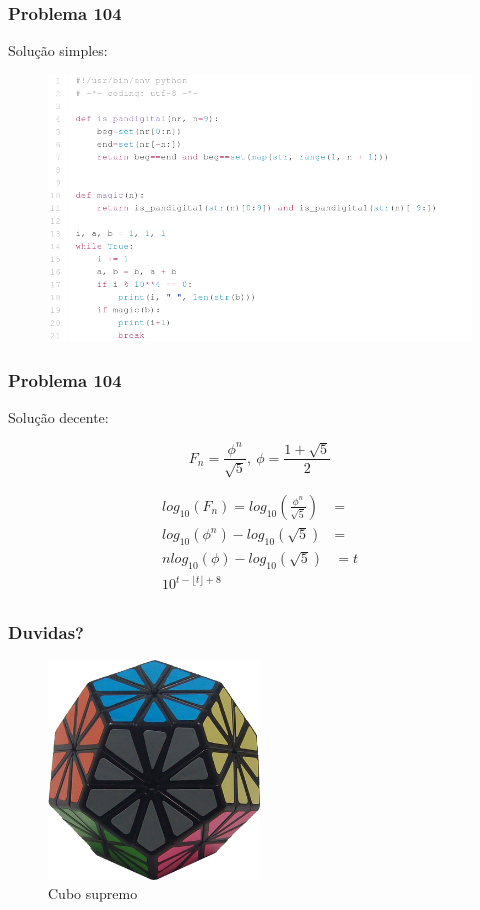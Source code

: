 \documentclass{beamer}
\begin{document}
\begin{frame}
    \frametitle{Problema 104}

    Solução simples:

    \begin{figure}[htpb]
        \centering
        \includegraphics[width=0.8\linewidth]{images/prob104.png}
    \end{figure}
\end{frame}

\begin{frame}
    \frametitle{Problema 104}

    Solução decente:

    \begin{equation}
        F_n = \frac{\phi^n}{\sqrt{5}},\: \phi = \frac{1+\sqrt{5}}{2}
    \end{equation}

    \begin{align}
        log_{10}(F_n) = log_{10}(\frac{\phi^n}{\sqrt{5}}) &= \\
        log_{10}(\phi^n) - log_{10}(\sqrt{5}) &=   \\
        n log_{10}(\phi) - log_{10}(\sqrt{5}) &= t \\
        10^{t-\lfloor t \rfloor + 8} \\
    \end{align}
\end{frame}




\begin{frame}
    \frametitle{Duvidas?}

    \begin{figure}
        \centering
        \includegraphics[width=0.5\textwidth]{cubo}
        \caption{Cubo supremo}
        \label{fig:my_label}
    \end{figure}
\end{frame}
\end{document}
